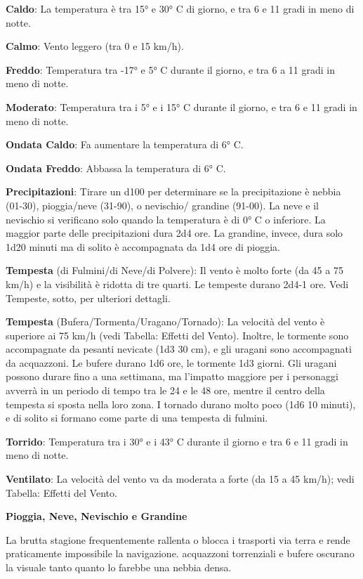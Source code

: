 \documentclass[a4paper,11pt,twoside,openany]{book}
\begin{document}
\textbf{Caldo}: La temperatura è tra 15° e 30° C di giorno, e tra 6 e 11 gradi in meno di notte.

\textbf{Calmo}: Vento leggero (tra 0 e 15 km/h).

\textbf{Freddo}: Temperatura tra -17° e 5° C durante il giorno, e tra 6 a 11 gradi in meno di notte.

\textbf{Moderato}: Temperatura tra i 5° e i 15° C durante il giorno, e tra 6 e 11 gradi in meno di notte.

\textbf{Ondata Caldo}: Fa aumentare la temperatura di 6° C.

\textbf{Ondata Freddo}: Abbassa la temperatura di 6° C.

\textbf{Precipitazioni}: Tirare un d100 per determinare se la precipitazione è nebbia (01-30), pioggia/neve (31-90), o nevischio/ grandine (91-00). La neve e il nevischio si verificano solo quando la temperatura è di 0° C o inferiore. La maggior parte delle precipitazioni dura 2d4 ore. La grandine, invece, dura solo 1d20 minuti ma di solito è accompagnata da 1d4 ore di pioggia.

\textbf{Tempesta} (di Fulmini/di Neve/di Polvere): Il vento è molto forte (da 45 a 75 km/h) e la visibilità è ridotta di tre quarti. Le tempeste durano 2d4-1 ore. Vedi Tempeste, sotto, per ulteriori dettagli.

\textbf{Tempesta} (Bufera/Tormenta/Uragano/Tornado): La velocità del vento è superiore ai 75 km/h (vedi Tabella: Effetti del Vento). Inoltre, le tormente sono accompagnate da pesanti nevicate (1d3 \texttimes{} 30 cm), e gli uragani sono accompagnati da acquazzoni. Le bufere durano 1d6 ore, le tormente 1d3 giorni. Gli uragani possono durare fino a una settimana, ma l'impatto maggiore per i personaggi avverrà in un periodo di tempo tra le 24 e le 48 ore, mentre il centro della tempesta si sposta nella loro zona. I tornado durano molto poco (1d6 \texttimes{} 10 minuti), e di solito si formano come parte di una tempesta di fulmini.

\textbf{Torrido}: Temperatura tra i 30° e i 43° C durante il giorno e tra 6 e 11 gradi in meno di notte.

\textbf{Ventilato}: La velocità del vento va da moderata a forte (da 15 a 45 km/h); vedi Tabella: Effetti del Vento.

\textbf{Pioggia, Neve, Nevischio e Grandine}

La brutta stagione frequentemente rallenta o blocca i trasporti via terra e rende praticamente impossibile la navigazione. acquazzoni torrenziali e bufere oscurano la visuale tanto quanto lo farebbe una nebbia densa.
\end{document}
